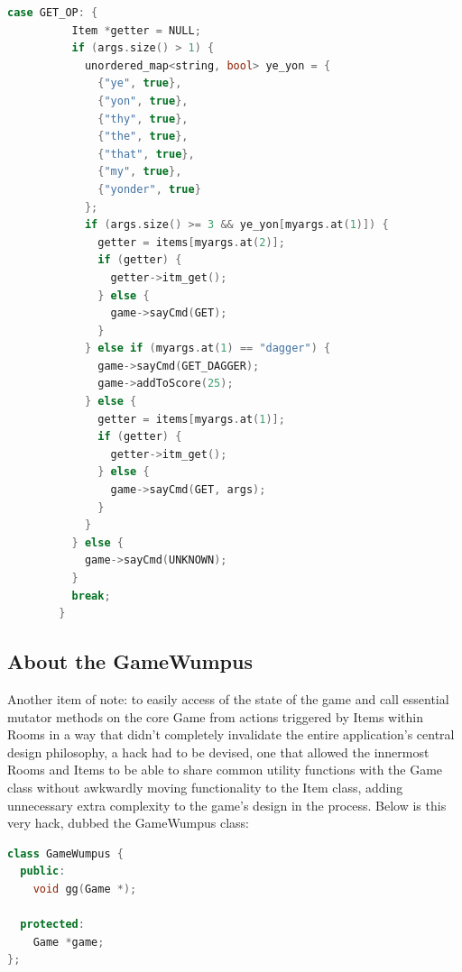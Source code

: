 \documentclass[man,12pt]{apa6}
\begin{document}
\begin{framed}
\begin{lstlisting}[language=C++]
        case GET_OP: {
          Item *getter = NULL;
          if (args.size() > 1) {
            unordered_map<string, bool> ye_yon = {
              {"ye", true},
              {"yon", true},
              {"thy", true},
              {"the", true},
              {"that", true},
              {"my", true},
              {"yonder", true}
            };
            if (args.size() >= 3 && ye_yon[myargs.at(1)]) {
              getter = items[myargs.at(2)];
              if (getter) {
                getter->itm_get();
              } else {
                game->sayCmd(GET);
              }
            } else if (myargs.at(1) == "dagger") {
              game->sayCmd(GET_DAGGER);
              game->addToScore(25);
            } else {
              getter = items[myargs.at(1)];
              if (getter) {
                getter->itm_get();
              } else {
                game->sayCmd(GET, args);
              }
            }
          } else {
            game->sayCmd(UNKNOWN);
          }
          break;
        }
\end{lstlisting}
\end{framed}

\subsection{About the \textsf{GameWumpus}}
Another item of note: to easily access of the state of the game and call essential
mutator methods on the core \textsf{Game} from actions triggered by \textsf{Item}s within
\textsf{Room}s in a way that didn't completely invalidate the entire application's central
design philosophy, a
hack had to be devised, one that allowed the innermost \textsf{Room}s and
\textsf{Item}s to be able to share common utility functions with the
\textsf{Game} class without awkwardly moving functionality to the
\textsf{Item} class, adding unnecessary extra complexity to the game's design in
the process.
Below is this very hack, dubbed the \textsf{GameWumpus} class:

\begin{framed}
\begin{lstlisting}[language=C++]
class GameWumpus {
  public:
    void gg(Game *);

  protected:
    Game *game;
};
\end{lstlisting}
\end{framed}
\end{document}
